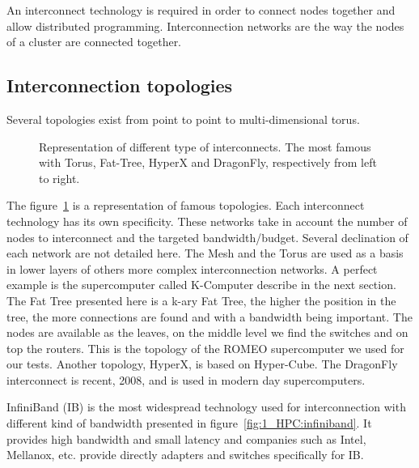 An interconnect technology is required in order to connect nodes together and allow distributed programming. 
Interconnection networks are the way the nodes of a cluster are connected together. 

\subsection{Interconnection topologies}
Several topologies exist from point to point to multi-dimensional torus.
%
\begin{figure}[t!]
\centering

\caption[Schematics of famous interconnection topologies]{Representation of different type of interconnects. The most famous with Torus, Fat-Tree, HyperX and DragonFly, respectively from left to right.}
\label{fig:1_HPC:topology}
\end{figure}
%
The figure~\ref{fig:1_HPC:topology} is a representation of famous topologies. 
Each interconnect technology has its own specificity. 
These networks take in account the number of nodes to interconnect and the targeted bandwidth/budget.
Several declination of each network are not detailed here. 
The Mesh and the Torus are used as a basis in lower layers of others more complex interconnection networks. 
A perfect example is the supercomputer called K-Computer describe in the next section.
The Fat Tree presented here is a k-ary Fat Tree, the higher the position in the tree, the more connections are found and with a bandwidth being important. 
The nodes are available as the leaves, on the middle level we find the switches and on top the routers. 
This is the topology of the ROMEO supercomputer we used for our tests. 
Another topology, HyperX\cite{ahn2009hyperx}, is based on Hyper-Cube.
The DragonFly\cite{kim2008technology} interconnect is recent, 2008, and is used in modern day supercomputers.

InfiniBand (IB) is the most widespread technology used for interconnection with different kind of bandwidth presented in figure~\ref{fig:1_HPC:infiniband}.
It provides high bandwidth and small latency and companies such as Intel, Mellanox, etc. provide directly adapters and switches specifically for IB. 

